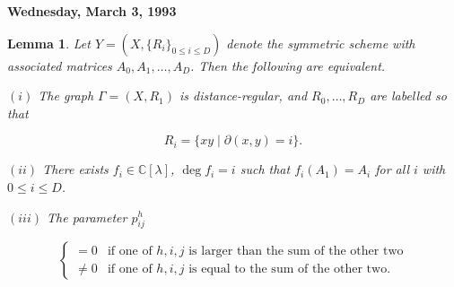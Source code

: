 \documentclass[
]{book}
\newtheorem{lemma}{Lemma}[chapter]
\theoremstyle{definition}
\theoremstyle{definition}
\theoremstyle{definition}
\theoremstyle{definition}
\theoremstyle{remark}
\begin{document}
\textbf{Wednesday, March 3, 1993}

\begin{lemma}
\protect\hypertarget{lem:dr-scheme}{}\label{lem:dr-scheme}Let \(Y = (X, \{R_i\}_{0\leq i\leq D})\) denote the symmetric scheme with associated matrices \(A_0, A_1, \ldots, A_D\). Then the following are equivalent.

\((i)\) The graph \(\Gamma = (X, R_1)\) is distance-regular, and \(R_0, \ldots, R_D\) are labelled so that

\[R_i = \{xy\mid \partial(x,y) = i\}.\]

\((ii)\) There exists \(f_i\in \mathbb{C}[\lambda]\), \(\deg f_i = i\) such that \(f_i(A_1) = A_i\) for all \(i\) with \(0\leq i\leq D\).

\((iii)\) The parameter \(p^h_{ij}\)

\[\begin{cases} = 0 & \text{if one of $h, i, j$ is larger than the sum of the other two}\\
\neq 0 & \text{if one of $h,i,j$ is equal to the sum of the other two.}\end{cases}\]
\end{lemma}
\end{document}
